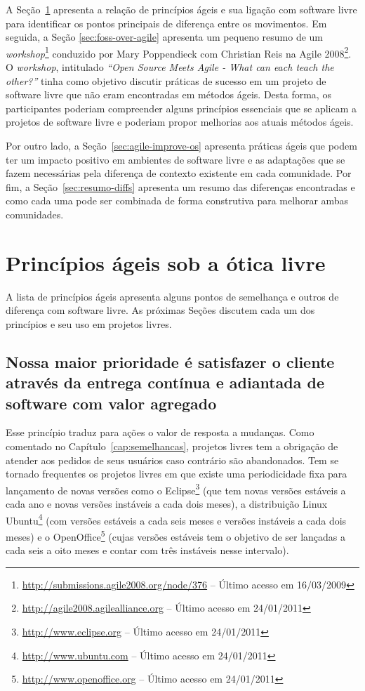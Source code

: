A Seção~\ref{sec:principles} apresenta a relação de princípios ágeis e
sua ligação com software livre para identificar os pontos principais
de diferença entre os movimentos. Em seguida, a Seção
\ref{sec:foss-over-agile} apresenta um pequeno resumo de um
\textit{workshop}\footnote{\url{http://submissions.agile2008.org/node/376}
  -- Último acesso em 16/03/2009} conduzido por Mary Poppendieck com
Christian Reis na Agile
2008\footnote{\url{http://agile2008.agilealliance.org} -- Último
  acesso em 24/01/2011}. O \textit{workshop}, intitulado
\textit{``Open Source Meets Agile - What can each teach the other?''}
tinha como objetivo discutir práticas de sucesso em um projeto de
software livre que não eram encontradas em métodos ágeis. Desta forma,
os participantes poderiam compreender alguns princípios essenciais que
se aplicam a projetos de software livre e poderiam propor melhorias
aos atuais métodos ágeis.

Por outro lado, a Seção~\ref{sec:agile-improve-os} apresenta práticas
ágeis que podem ter um impacto positivo em ambientes de software livre
e as adaptações que se fazem necessárias pela diferença de contexto
existente em cada comunidade. Por fim, a Seção~\ref{sec:resumo-diffs}
apresenta um resumo das diferenças encontradas e como cada uma pode
ser combinada de forma construtiva para melhorar ambas comunidades.

\section{Princípios ágeis sob a ótica livre}
\label{sec:principles}

A lista de princípios ágeis apresenta alguns pontos de semelhança e
outros de diferença com software livre. As próximas Seções discutem
cada um dos princípios e seu uso em projetos livres.

\subsection[Satisfação do cliente]{Nossa maior prioridade é satisfazer
  o cliente através da entrega contínua e adiantada de software com
  valor agregado}

Esse princípio traduz para ações o valor de resposta a mudanças. Como
comentado no Capítulo~\ref{cap:semelhancas}, projetos livres tem a
obrigação de atender aos pedidos de seus usuários caso contrário são
abandonados. Tem se tornado frequentes os projetos livres em que
existe uma periodicidade fixa para lançamento de novas versões como o
Eclipse\footnote{\url{http://www.eclipse.org} -- Último acesso em
  24/01/2011} (que tem novas versões estáveis a cada ano e novas
versões instáveis a cada dois meses), a distribuição Linux
Ubuntu\footnote{\url{http://www.ubuntu.com} -- Último acesso em
  24/01/2011} (com versões estáveis a cada seis meses e versões
instáveis a cada dois meses) e o
OpenOffice\footnote{\url{http://www.openoffice.org} -- Último acesso
  em 24/01/2011} (cujas versões estáveis tem o objetivo de ser
lançadas a cada seis a oito meses e contar com três instáveis nesse
intervalo).

